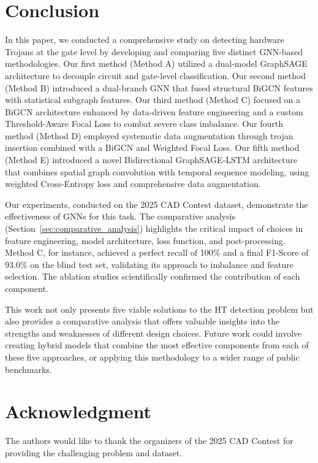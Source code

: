 \documentclass[conference]{IEEEtran}
\begin{document}
\section{Conclusion}
\label{sec:conclusion}
In this paper, we conducted a comprehensive study on detecting hardware Trojans at the gate level by developing and comparing five distinct GNN-based methodologies. Our first method (Method A) utilized a dual-model GraphSAGE architecture to decouple circuit and gate-level classification. Our second method (Method B) introduced a dual-branch GNN that fused structural BiGCN features with statistical subgraph features. Our third method (Method C) focused on a BiGCN architecture enhanced by data-driven feature engineering and a custom Threshold-Aware Focal Loss to combat severe class imbalance. Our fourth method (Method D) employed systematic data augmentation through trojan insertion combined with a BiGCN and Weighted Focal Loss. Our fifth method (Method E) introduced a novel Bidirectional GraphSAGE-LSTM architecture that combines spatial graph convolution with temporal sequence modeling, using weighted Cross-Entropy loss and comprehensive data augmentation.

Our experiments, conducted on the 2025 CAD Contest dataset, demonstrate the effectiveness of GNNs for this task. The comparative analysis (Section~\ref{sec:comparative_analysis}) highlights the critical impact of choices in feature engineering, model architecture, loss function, and post-processing. Method C, for instance, achieved a perfect recall of 100\% and a final F1-Score of 93.0\% on the blind test set, validating its approach to imbalance and feature selection. The ablation studies scientifically confirmed the contribution of each component.

This work not only presents five viable solutions to the HT detection problem but also provides a comparative analysis that offers valuable insights into the strengths and weaknesses of different design choices. Future work could involve creating hybrid models that combine the most effective components from each of these five approaches, or applying this methodology to a wider range of public benchmarks.

\section*{Acknowledgment}
The authors would like to thank the organizers of the 2025 CAD Contest for providing the challenging problem and dataset.
\end{document}
